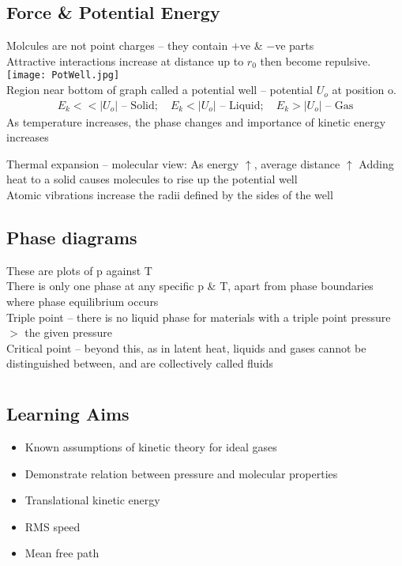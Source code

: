 \documentclass[a4paper, 11pt, fleqn, normalem]{report}
\begin{document}
\section{Force \& Potential Energy}
Molcules are not point charges -- they contain $+$ve \& $-$ve parts \\
Attractive interactions increase at distance up to $r_{0}$ then become repulsive. \\
\texttt{[image: PotWell.jpg]} \\
Region near bottom of graph called a potential well -- potential $U_{o}$ at position o.
\begin{align*}
	E_{k} << |U_{o}| \text{ -- Solid};\quad
	E_{k} < |U_{o}| \text{ -- Liquid};\quad
	E_{k} > |U_{o}| \text{ -- Gas}
\end{align*}
As temperature increases, the phase changes and importance of kinetic energy increases

Thermal expansion -- molecular view:
As energy $\uparrow$, average distance $\uparrow$
Adding heat to a solid causes molecules to rise up the potential well \\
Atomic vibrations increase the radii defined by the sides of the well

\section{Phase diagrams}
These are plots of p against T \\
There is only one phase at any specific p \& T, apart from phase boundaries where phase equilibrium occurs \\
Triple point -- there is no liquid phase for materials with a triple point pressure $>$ the given pressure \\
Critical point -- beyond this, as in latent heat, liquids and gases cannot be distinguished between, and are collectively called fluids

\chapter{}
\thispagestyle{fancy}
\section{Learning Aims}
\begin{itemize}
	\item Known assumptions of kinetic theory for ideal gases
	\item Demonstrate relation between pressure and molecular properties
	\item Translational kinetic energy
	\item RMS speed
	\item Mean free path
\end{itemize}
\end{document}
